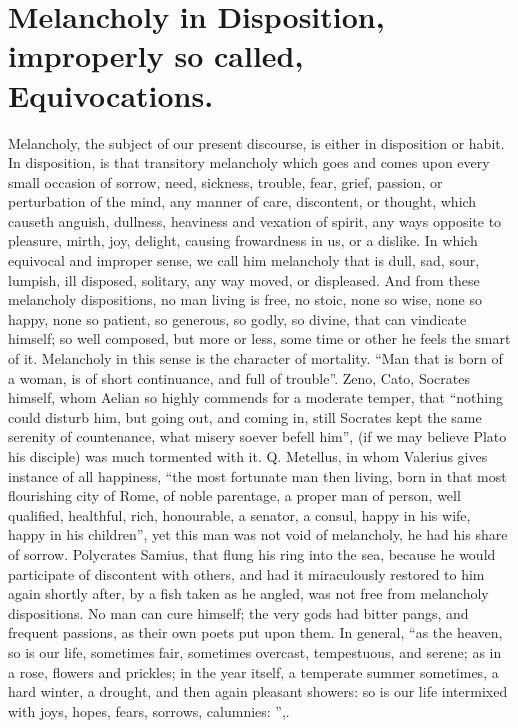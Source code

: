 \clearpage{}
\thispagestyle{titleontop}

\section[Melancholic Disposition]{Melancholy in Disposition, improperly so called, Equivocations.}

Melancholy, the subject of our present discourse, is either in disposition or
habit. In disposition, is that transitory melancholy which goes and comes upon
every small occasion of sorrow, need, sickness, trouble, fear, grief, passion,
or perturbation of the mind, any manner of care, discontent, or thought, which
causeth anguish, dullness, heaviness and vexation of spirit, any ways opposite
to pleasure, mirth, joy, delight, causing frowardness in us, or a dislike. In
which equivocal and improper sense, we call him melancholy that is dull, sad,
sour, lumpish, ill disposed, solitary, any way moved, or displeased. And from
these melancholy dispositions, no man living is free, no
stoic, none so wise, none so happy, none so patient, so generous, so godly, so
divine, that can vindicate himself; so well composed, but more or less, some
time or other he feels the smart of it. Melancholy in this sense is the
character of mortality. \enquote{Man that is born of a woman, is of
short continuance, and full of trouble}. Zeno, Cato, Socrates himself, whom
Aelian so highly commends for a moderate temper, that
\enquote{nothing could disturb him, but going out, and coming in, still Socrates kept
the same serenity of countenance, what misery soever befell him}, (if we may
believe Plato his disciple) was much tormented with it. Q. Metellus, in whom
Valerius gives instance of all happiness, \enquote{the most
fortunate man then living, born in that most flourishing city of Rome, of noble
parentage, a proper man of person, well qualified, healthful, rich, honourable,
a senator, a consul, happy in his wife, happy in his children}, \etc{} yet this
man was not void of melancholy, he had his share of sorrow.
Polycrates Samius, that flung his ring into the sea,
because he would participate of discontent with others, and had it miraculously
restored to him again shortly after, by a fish taken as he angled, was not free
from melancholy dispositions. No man can cure himself; the very gods had bitter
pangs, and frequent passions, as their own poets put upon
them. In general, \enquote{as the heaven, so is our life, sometimes
fair, sometimes overcast, tempestuous, and serene; as in a rose, flowers and
prickles; in the year itself, a temperate summer sometimes, a hard winter, a
drought, and then again pleasant showers: so is our life intermixed with joys,
hopes, fears, sorrows, calumnies: },.

